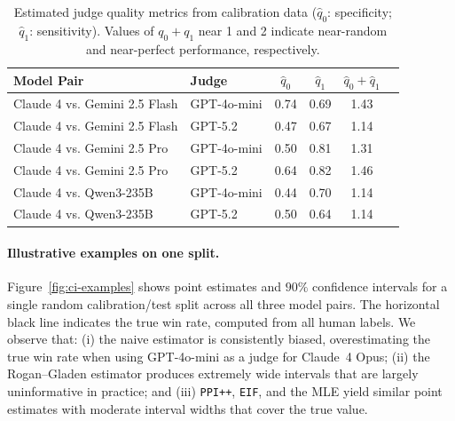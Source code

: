 \documentclass[11pt]{article}
\newcommand{\1}{\mathbf{1}}
\theoremstyle{remark}
\begin{document}
  \begin{table}[t]
      \centering
      \caption{Estimated judge quality metrics from calibration data ($\hat{q}_0$: specificity; $\hat{q}_1$: sensitivity). Values of $q_0 + q_1$ near 1 and 2 indicate near-random and near-perfect performance, respectively.}
      \label{tab:judge-quality}
      \begin{tabular}{llcccc}
          \toprule
          Model Pair & Judge & $\hat{q}_0$ & $\hat{q}_1$ & $\hat{q}_0 + \hat{q}_1$ \\
          \midrule
          Claude 4 vs. Gemini 2.5 Flash & GPT-4o-mini & 0.74 & 0.69 & 1.43 \\
           Claude 4 vs. Gemini 2.5 Flash & GPT-5.2     & 0.47 & 0.67 & 1.14 \\
          \midrule
           Claude 4 vs. Gemini 2.5 Pro   & GPT-4o-mini & 0.50 & 0.81 & 1.31 \\
          Claude 4 vs.  Gemini 2.5 Pro   & GPT-5.2     & 0.64 & 0.82 & 1.46 \\
          \midrule
           Claude 4 vs. Qwen3-235B       & GPT-4o-mini & 0.44 & 0.70 & 1.14 \\
           Claude 4 vs. Qwen3-235B       & GPT-5.2     & 0.50 & 0.64 & 1.14 \\
          \bottomrule
      \end{tabular}
  \end{table}

\paragraph{Illustrative examples on one split.}
Figure~\ref{fig:ci-examples} shows point estimates and $90\%$ confidence intervals for a single random calibration/test split across all three model pairs.
The horizontal black line indicates the true win rate, computed from all human labels. We observe that: 
(i) the naive estimator is consistently biased, overestimating the true win rate when using GPT-4o-mini as a judge for Claude~4 Opus;
(ii) the Rogan--Gladen estimator produces extremely wide intervals that are largely uninformative in practice; and
(iii) \texttt{PPI++}, \texttt{EIF}, and the MLE yield similar point estimates with moderate interval widths that cover the true value.
\end{document}

